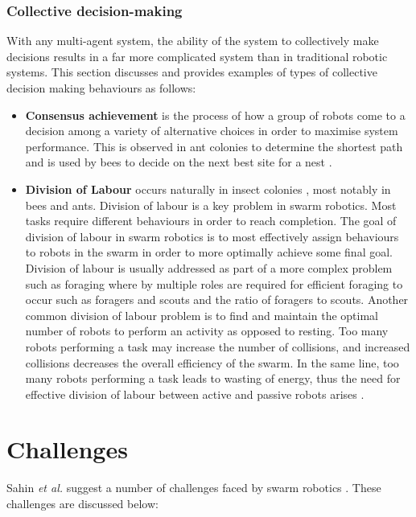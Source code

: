 \subsubsection{Collective decision-making}
With any multi-agent system, the ability of the system to collectively make decisions results in a far more complicated system than in traditional robotic systems. This section discusses and provides examples of types of collective decision making behaviours as follows: 

\begin{itemize}
	\item \textbf{Consensus achievement} is the process of how a group of robots come to a decision among a variety of alternative choices in order to maximise system performance. This is observed in ant colonies to determine the shortest path \cite{bonabeau2001self} and is used by bees to decide on the next best site for a nest \cite{seeley2001nest}.
	
	\item \textbf{Division of Labour} occurs naturally in insect colonies \cite{gautrais2002emergent}, most notably in bees and ants. Division of labour is a key problem in swarm robotics. Most tasks require different behaviours in order to reach completion. The goal of division of labour in swarm robotics is to most effectively assign behaviours to robots in the swarm in order to more optimally achieve some final goal. Division of labour is usually addressed as part of a more complex problem such as foraging where by multiple roles are required for efficient foraging to occur such as foragers and scouts and the ratio of foragers to scouts. Another common division of labour problem is to find and maintain the optimal number of robots to perform an activity as opposed to resting. Too many robots performing a task may increase the number of collisions, and increased collisions decreases the overall efficiency of the swarm. In the same line, too many robots performing a task leads to wasting of energy, thus the need for effective division of labour between active and passive robots arises \cite{jones2003adaptive, krieger2000call}.

\end{itemize}

\section{Challenges}
\label{challenges}

Sahin \textit{et al.} suggest a number of challenges faced by swarm robotics \cite{csahin2008special}. These challenges are discussed below: 

